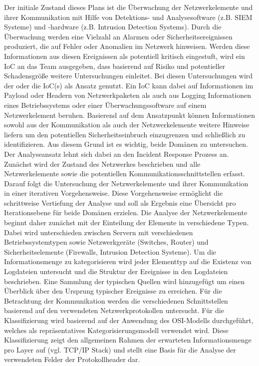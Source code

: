 Der initiale Zustand dieses Plans ist die Überwachung der Netzwerkelemente und ihrer Kommunikation mit Hilfe von Detektions- und Analysesoftware (z.B. SIEM Systeme) und -hardware (z.B. \glqq Intrusion Detection Systems\grqq ). Durch die Überwachung werden eine Vielzahl an Alarmen oder Sicherheitsereignissen produziert, die auf Fehler oder Anomalien im Netzwerk hinweisen. Werden diese Informationen aus diesen Ereignissen als potentiell kritisch eingestuft, wird ein IoC an das Team ausgegeben, dass basierend auf Risiko und potentieller Schadensgröße weitere Untersuchungen einleitet. Bei diesen Untersuchungen wird der oder die IoC(s) als Ansatz genutzt. Ein IoC kann dabei auf Informationen im Payload oder Headern von Netzwerkpaketen als auch aus Logging Informationen eines Betriebssystems oder einer Überwachungssoftware auf einem Netzwerkelement beruhen. Basierend auf dem Ansatzpunkt können Informationen sowohl aus der Kommunikation als auch der Netzwerkelemente weitere Hinweise liefern um den potentiellen Sicherheitseinbruch einzugrenzen und schließlich zu identifizieren.
Aus diesem Grund ist es wichtig, beide Domänen zu untersuchen. Der Analyseansatz lehnt sich dabei an den Incident Response Prozess an. Zunächst wird der Zustand des Netzwerkes beschrieben und alle Netzwerkelemente sowie die potentiellen Kommunikationsschnittstellen erfasst. Darauf folgt die Untersuchung der Netzwerkelemente und ihrer Kommunikation in einer iterativen Vorgehensweise. Diese Vorgehensweise ermöglicht die schrittweise Vertiefung der Analyse  und soll als Ergebnis eine Übersicht pro Iterationsebene für beide Domänen erzielen. 
Die Analyse der Netzwerkelemente beginnt daher zunächst mit der Einteilung der Elemente in verschiedene Typen. Dabei wird unterschieden zwischen Servern mit verschiedenen Betriebssystemtypen sowie Netzwerkgeräte (Switches, Router) und Sicherheitselemente (Firewalls, Intrusion Detection Systeme). Um die Informationsmenge zu kategorisieren wird jeder Elementtyp auf die Existenz von Logdateien untersucht und die Struktur der Ereignisse in den Logdateien beschrieben. Eine Sammlung der typischen Quellen wird hinzugefügt um einen Überblick über den Ursprung typischer Ereignisse zu erreichen.
Für die Betrachtung der Kommunikation werden die verschiedenen Schnittstellen basierend auf den verwendeten Netzwerkprotokollen untersucht. Für die Klassifizierung wird basierend auf der Anwendung des OSI-Modells durchgeführt, welches als repräsentatives Kategorisierungsmodell verwendet wird. Diese Klassifizierung zeigt den allgemeinen Rahmen der erwarteten Informationsmenge pro Layer auf (vgl. TCP/IP Stack) und stellt eine Basis für die Analyse der verwendeten Felder der Protokollheader dar. 

